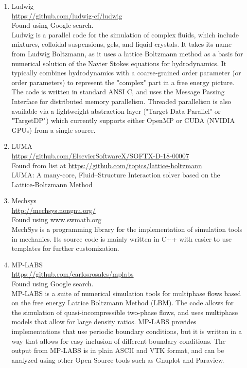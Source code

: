 \documentclass{article}
\begin{document}
\begin{enumerate}
	\item Ludwig
	\\
	\href{https://github.com/ludwig-cf/ludwig}{https://github.com/ludwig-cf/ludwig}\\
	Found using Google search.\\
	Ludwig is a parallel code for the simulation of complex fluids, which include mixtures, colloidal suspensions, gels, and liquid crystals. It takes its name from Ludwig Boltzmann, as it uses a lattice Boltzmann method as a basis for numerical solution of the Navier Stokes equations for hydrodynamics. It typically combines hydrodynamics with a coarse-grained order parameter (or order parameters) to represent the "complex" part in a free energy picture. The code is written in standard ANSI C, and uses the Message Passing Interface for distributed memory parallelism. Threaded parallelism is also available via a lightweight abstraction layer ("Target Data Parallel" or "TargetDP") which currently supports either OpenMP or CUDA (NVIDIA GPUs) from a single source.
	
	\item LUMA
	\\
	\href{https://github.com/ElsevierSoftwareX/SOFTX-D-18-00007}{https://github.com/ElsevierSoftwareX/SOFTX-D-18-00007}\\
	Found from list at \href{https://github.com/topics/lattice-boltzmann}{https://github.com/topics/lattice-boltzmann}\\
	LUMA: A many-core, Fluid–Structure Interaction solver based on the Lattice-Boltzmann Method
	
	\item Mechsys \\
	\href{http://mechsys.nongnu.org/}{http://mechsys.nongnu.org/}\\
	Found using www.swmath.org \\
	MechSys is a programming library for the implementation of simulation tools in mechanics. Its source code is mainly written in C++ with easier to use templates for further customization.
	
	\item MP-LABS
	\\
	\href{https://github.com/carlosrosales/mplabs}{https://github.com/carlosrosales/mplabs}
	\\
	Found using Google search.\\
	MP-LABS is a suite of numerical simulation tools for multiphase flows based on the free energy Lattice Boltzmann Method (LBM). The code allows for the simulation of quasi-incompressible two-phase flows, and uses multiphase models that allow for large density ratios. MP-LABS provides implementations that use periodic boundary conditions, but it is written in a way that allows for easy inclusion of different boundary conditions. The output from MP-LABS is in plain ASCII and VTK format, and can be analyzed using other Open Source tools such as Gnuplot and Paraview.
	

\end{enumerate}
\end{document}
